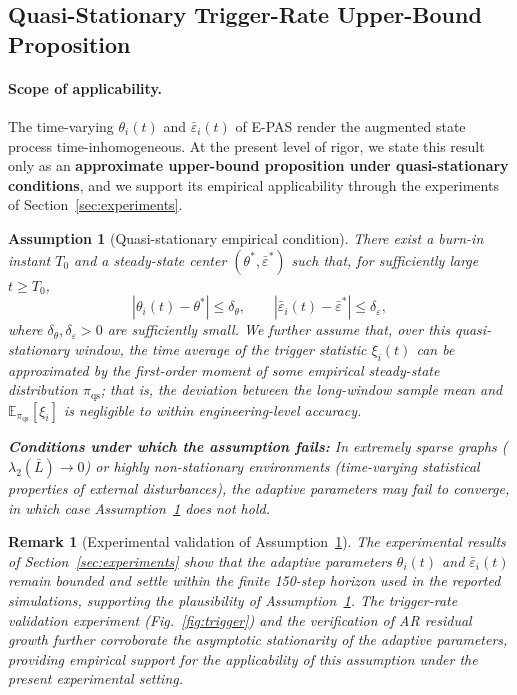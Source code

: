 \documentclass[10pt]{article}
\newtheorem{assumption}{Assumption}[section]
\newtheorem{remark}{Remark}[section]
\newcommand{\AR}{AR}
\begin{document}
\subsection{Quasi-Stationary Trigger-Rate Upper-Bound Proposition}

\paragraph{Scope of applicability.}
The time-varying $\theta_i(t)$ and $\bar{\varepsilon}_i(t)$ of E-PAS render the augmented state process time-inhomogeneous. At the present level of rigor, we state this result only as an \textbf{approximate upper-bound proposition under quasi-stationary conditions}, and we support its empirical applicability through the experiments of Section~\ref{sec:experiments}.

\begin{assumption}[Quasi-stationary empirical condition]\label{ass:ergodic}
  There exist a burn-in instant $T_0$ and a steady-state center $(\theta^*,\bar{\varepsilon}^*)$ such that, for sufficiently large $t\geq T_0$,
  \[
    |\theta_i(t)-\theta^*|\leq\delta_\theta,\qquad
    |\bar{\varepsilon}_i(t)-\bar{\varepsilon}^*|\leq\delta_\varepsilon,
  \]
  where $\delta_\theta,\delta_\varepsilon>0$ are sufficiently small. We further assume that, over this quasi-stationary window, the time average of the trigger statistic $\xi_i(t)$ can be approximated by the first-order moment of some empirical steady-state distribution $\pi_{\mathrm{qs}}$; that is, the deviation between the long-window sample mean and $\mathbb{E}_{\pi_{\mathrm{qs}}}[\xi_i]$ is negligible to within engineering-level accuracy.

  \textbf{Conditions under which the assumption fails:} In extremely sparse graphs ($\lambda_2(\bar{L}) \to 0$) or highly non-stationary environments (time-varying statistical properties of external disturbances), the adaptive parameters may fail to converge, in which case Assumption~\ref{ass:ergodic} does not hold.
\end{assumption}

\begin{remark}[Experimental validation of Assumption~\ref{ass:ergodic}]
The experimental results of Section~\ref{sec:experiments} show that the adaptive parameters $\theta_i(t)$ and $\bar{\varepsilon}_i(t)$ remain bounded and settle within the finite 150-step horizon used in the reported simulations, supporting the plausibility of Assumption~\ref{ass:ergodic}. The trigger-rate validation experiment (Fig.~\ref{fig:trigger}) and the verification of \AR{} residual growth further corroborate the asymptotic stationarity of the adaptive parameters, providing empirical support for the applicability of this assumption under the present experimental setting.
\end{remark}
\end{document}
